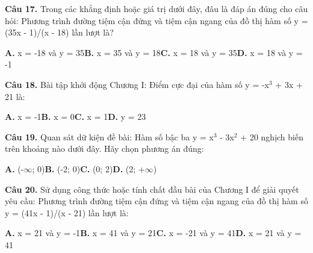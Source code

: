 \documentclass[11pt,a4paper]{article}
\begin{document}
\textbf{\color{primary} Câu 17.} Trong các khẳng định hoặc giá trị dưới đây, đâu là đáp án đúng cho câu hỏi: Phương trình đường tiệm cận đứng và tiệm cận ngang của đồ thị hàm số y = (35x - 1)/(x - 18) lần lượt là?\par
\hspace*{1.5em}\textbf{A.} x = -18 và y = 35\quad\quad \textbf{B.} x = 35 và y = 18\quad\quad \textbf{C.} x = 18 và y = 35\quad\quad \textbf{D.} x = 18 và y = -1\par\vspace{2pt}
\textbf{\color{primary} Câu 18.} Bài tập khởi động Chương I: Điểm cực đại của hàm số y = -x$^3$ + 3x + 21 là:\par
\hspace*{1.5em}\textbf{A.} x = -1\quad\quad \textbf{B.} x = 0\quad\quad \textbf{C.} x = 1\quad\quad \textbf{D.} y = 23\par\vspace{2pt}
\textbf{\color{primary} Câu 19.} Quan sát dữ kiện đề bài: Hàm số bậc ba y = x$^3$ - 3x$^2$ + 20 nghịch biến trên khoảng nào dưới đây. Hãy chọn phương án đúng:\par
\hspace*{1.5em}\textbf{A.} (-$\infty$; 0)\quad\quad \textbf{B.} (-2; 0)\quad\quad \textbf{C.} (0; 2)\quad\quad \textbf{D.} (2; +$\infty$)\par\vspace{2pt}
\textbf{\color{primary} Câu 20.} Sử dụng công thức hoặc tính chất đầu bài của Chương I để giải quyết yêu cầu: Phương trình đường tiệm cận đứng và tiệm cận ngang của đồ thị hàm số y = (41x - 1)/(x - 21) lần lượt là:\par
\hspace*{1.5em}\textbf{A.} x = 21 và y = -1\quad\quad \textbf{B.} x = 41 và y = 21\quad\quad \textbf{C.} x = -21 và y = 41\quad\quad \textbf{D.} x = 21 và y = 41\par\vspace{2pt}
\end{document}
